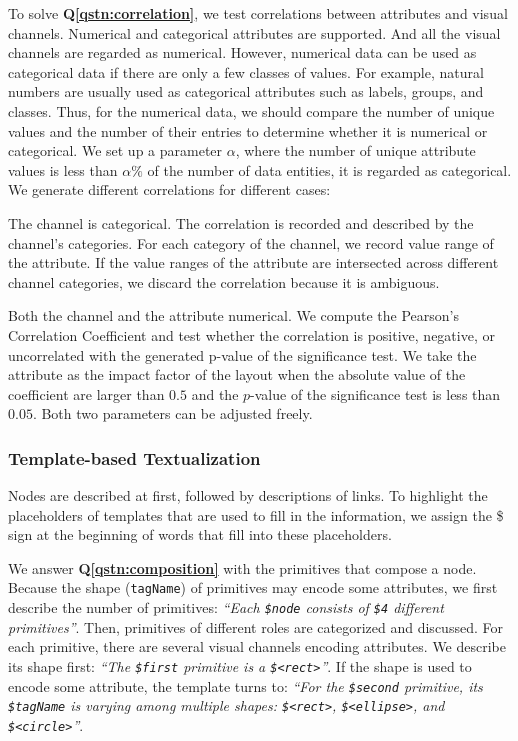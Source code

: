 To solve \textbf{Q\ref{qstn:correlation}}, we test correlations between attributes and visual channels.
Numerical and categorical attributes are supported.
And all the visual channels are regarded as numerical.
However, numerical data can be used as categorical data if there are only a few classes of values.
For example, natural numbers are usually used as categorical attributes such as labels, groups, and classes.
Thus, for the numerical data, we should compare the number of unique values and the number of their entries to determine whether it is numerical or categorical.
We set up a parameter $\alpha$, where the number of unique attribute values is less than $\alpha \%$ of the number of data entities, it is regarded as categorical.
We generate different correlations for different cases:
\begin{compactitem}
    \item The channel is categorical. The correlation is recorded and described by the channel's categories. For each category of the channel, we record value range of the attribute. %
    If the value ranges of the attribute are intersected across different channel categories, we discard the correlation because it is ambiguous.
    \item Both the channel and the attribute numerical. We compute the Pearson's Correlation Coefficient and test whether the correlation is positive, negative, or uncorrelated with the generated p-value of the significance test. We take the attribute as the impact factor of the layout when the absolute value of the coefficient are larger than $0.5$ and the $p$-value of the significance test is less than $0.05$. 
    Both two parameters can be adjusted freely.
\end{compactitem}


\subsubsection {Template-based Textualization}
Nodes are described at first, followed by descriptions of links. 
To highlight the placeholders of templates that are used to fill in the information, we assign the \$ sign at the beginning of words that fill into these placeholders.

We answer \textbf{Q\ref{qstn:composition}} with the primitives that compose a node.
Because the shape (\texttt{tagName}) of primitives may encode some attributes, we first describe the number of primitives:
\textit{``Each \texttt{\$node} consists of \texttt{\$4} different primitives''}. 
Then, primitives of different roles are categorized and discussed. 
For each primitive, there are several visual channels encoding attributes.
We describe its shape first: \textit{``The \texttt{\$first} primitive is a \texttt{\$<rect>}''}.
If the shape is used to encode some attribute, the template turns to: \textit{``For the \texttt{\$second} primitive, its \texttt{\$tagName} is varying among multiple shapes: \texttt{\$<rect>}, \texttt{\$<ellipse>}, and \texttt{\$<circle>}''}.

